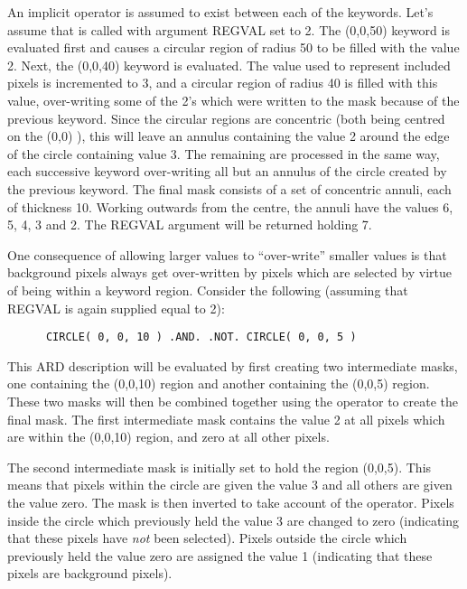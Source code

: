 An implicit  operator is assumed to exist between each of the 
keywords. Let's assume that  is called with argument REGVAL set to
2. The (0,0,50) keyword is evaluated first and causes a circular region
of radius 50 to be filled with the value 2. Next, the (0,0,40) keyword is
evaluated. The value used to represent included pixels is incremented to 3, and
a circular region of radius 40 is filled with this value, over-writing some of
the 2's which were written to the mask because of the previous keyword. Since
the circular regions are concentric (both being centred on the (0,0) ), this
will leave an annulus containing the value 2 around the edge of the circle
containing value 3. The remaining  are processed in the same way, each
successive keyword over-writing all but an annulus of the circle created by the
previous keyword. The final mask consists of a set of concentric annuli, each of
thickness 10. Working outwards from the centre, the annuli have the values 6, 5,
4, 3 and 2. The REGVAL argument will be returned holding 7.

One consequence of allowing larger values to ``over-write'' smaller values is
that background pixels always get over-written by pixels which are selected by
virtue of being within a keyword region. Consider the following (assuming that 
REGVAL is again supplied equal to 2): 

\small
\begin{verbatim}
      CIRCLE( 0, 0, 10 ) .AND. .NOT. CIRCLE( 0, 0, 5 )
\end{verbatim}
\normalsize

This ARD description will be evaluated by first creating two intermediate masks,
one containing the (0,0,10) region and another containing the
(0,0,5) region. These two masks will then be combined together using
the  operator to create the final mask. The first intermediate mask
contains the value 2 at all pixels which are within the (0,0,10) region,
and zero at all other pixels. 

The second intermediate mask is initially set to hold the region (0,0,5).
This means that pixels within the circle are given the value 3 and all others
are given the value zero. The mask is then inverted to take account of the 
operator. Pixels inside the circle which previously held the value 3 are changed
to zero (indicating that these pixels have {\em not} been selected). Pixels
outside the circle which previously held the value zero are assigned the value 1
(indicating that these pixels are background pixels). 

